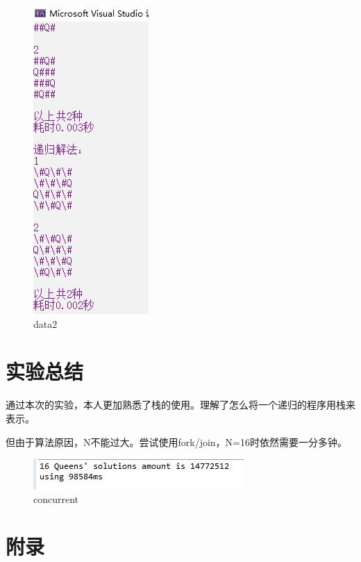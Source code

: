 \documentclass[UTF8]{article}
\begin{document}
	\begin{figure}[H]
		\centering
		\includegraphics[scale=0.7]{data2.jpg}
		\caption{data2}
		\label{data2}
	\end{figure}\par


	\section{实验总结}
	通过本次的实验，本人更加熟悉了栈的使用。理解了怎么将一个递归的程序用栈来表示。\par
	但由于算法原因，N不能过大。尝试使用fork/join，N=16时依然需要一分多钟。\par


	\begin{figure}[H]
		\centering
		\includegraphics[scale=0.7]{concurrent.jpg}
		\caption{concurrent}
		\label{concurrent}
	\end{figure}\par



	\section{附录}
\end{document}
